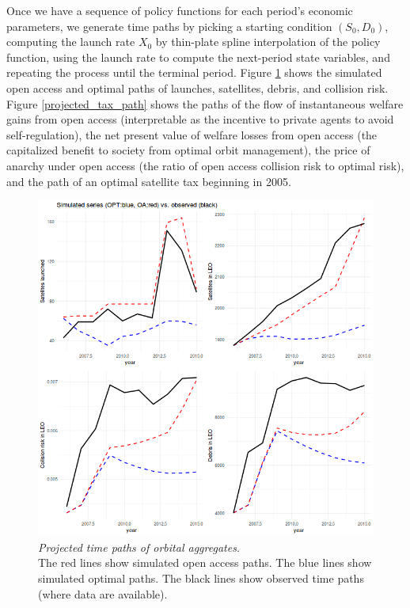 \documentclass[12pt]{article}
\begin{document}
Once we have a sequence of policy functions for each period's economic parameters, we generate time paths by picking a starting condition $(S_0,D_0)$, computing the launch rate $X_0$ by thin-plate spline interpolation of the policy function, using the launch rate to compute the next-period state variables, and repeating the process until the terminal period. Figure \ref{projected_path_of_states} shows the simulated open access and optimal paths of launches, satellites, debris, and collision risk. Figure \ref{projected_tax_path} shows the paths of the flow of instantaneous welfare gains from open access (interpretable as the incentive to private agents to avoid self-regulation), the net present value of welfare losses from open access (the capitalized benefit to society from optimal orbit management), the price of anarchy under open access (the ratio of open access collision risk to optimal risk), and the path of an optimal satellite tax beginning in 2005.

\begin{figure}[H]
	\centering
	\includegraphics[width=\textwidth]{../../images/32_pt_opt_simulated_historical_series.png}
	\captionsetup{format=hang}
	\caption{\textit{Projected time paths of orbital aggregates.} \\
		The red lines show simulated open access paths. The blue lines show simulated optimal paths. The black lines show observed time paths (where data are available).
	}
	\label{projected_path_of_states}
\end{figure}
\end{document}
